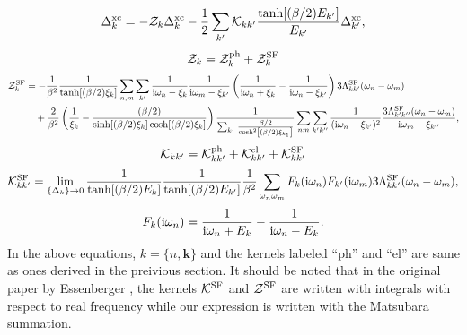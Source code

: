 %
\begin{equation}
	\Delta^{\rm xc}_{k} = -{\mathcal Z}_{k}\Delta^{\rm xc}_{k} - \frac{1}{2}
	\sum_{k'} {\mathcal K}_{kk'} \frac{\tanh[(\beta/2)E_{k'}]}
	{E_{k'}} \Delta^{\rm xc}_{k'},
	\label{eq:aftergapeq}
\end{equation}
%
\begin{equation}
	\mathcal Z_{k} = \mathcal Z^{\rm ph}_{k} + \mathcal Z^{\rm SF}_{k} 
	\label{eq:Zsum}
\end{equation}
%
\begin{equation}
	\begin{split}
		\mathcal Z^{\rm SF}_{k} &= -\frac{1}{\beta^2}\frac{1}{\tanh[(\beta/2)\xi_{k}]} 
	\sum_{n,m}\sum_{k'}\frac{1}{{\rm i}\omega_n - \xi_k}\frac{1}{{\rm i}\omega_m - \xi_{k'}}
	\left(\frac{1}{{\rm i}\omega_n + \xi_k} - \frac{1}{ {\rm i}\omega_n - \xi_{k'}} \right)3\Lambda^{\rm SF}_{kk'}(\omega_n - \omega_m) \\
	&\quad + \frac{2}{\beta^2}\left(\frac{1}{\xi_k} - \frac{(\beta/2)}{\sinh[(\beta/2)\xi_k]\cosh[(\beta/2)\xi_k]} \right)
	\frac{1}
	{\sum_{k_1}\frac{\beta/2}{\cosh^2\left[(\beta/2)\xi_{k_1}\right]}}
	\sum_{nm}\sum_{k'k''} \frac{1}{({\rm i}\omega_n - \xi_{k'})^2} \frac{3\Lambda^{\rm SF}_{k'k''}(\omega_n - \omega_m)}{ {\rm i}\omega_m - \xi_{k''}},
	\label{eq:ZSFdef}
\end{split}
\end{equation}
%
\begin{equation}
	\mathcal K_{kk'} = \mathcal K^{\rm ph}_{kk'} + \mathcal K^{\rm el}_{kk'} + \mathcal K^{\rm SF}_{kk'}
	\label{eq:Ksum}
\end{equation}
%
\begin{equation}
	{\mathcal K}^{\rm SF}_{kk'} = 
	\lim_{\{\Delta_{k}\} \to 0}
	\frac{1}{\tanh[(\beta/2)E_{k}]}\frac{1}{\tanh[(\beta/2)E_{k'}]}
	\frac{1}{\beta^2}
	\sum_{\omega_n\omega_m}
	F_{k}({\rm i}\omega_n)F_{k'}({\rm i}\omega_m)
	3\Lambda^{\rm SF}_{kk'}(\omega_n - \omega_m),
	\label{eq:KSFdef}
\end{equation}
%
\begin{equation}
	F_{k}({\rm i}\omega_n) = \frac{1}{ {\rm i}\omega_n + E_{k}} - 
	\frac{1}{ {\rm i}\omega_n - E_{k}}.
	\label{eq:Fkdef}
\end{equation}
%
In the above equations, $k = \{n,\bm k \}$ and the kernels labeled ``ph'' and ``el'' are same as ones
derived in the preivious section. It should be noted that in the original paper by Essenberger
\cite{Essenberger2014}, the kernels $\mathcal K^{\rm SF}$ and $\mathcal Z^{\rm SF}$ are written 
with integrals with respect to real frequency while our expression is written with the Matsubara summation.
